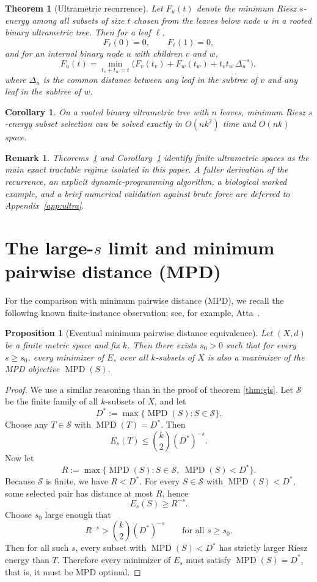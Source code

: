 \documentclass[11pt]{article}
\newtheorem{theorem}{Theorem}
\newtheorem{proposition}{Proposition}
\newtheorem{remark}{Remark}
\newtheorem{corollary}{Corollary}
\newcommand{\MM}[1]{\operatorname{MPD}\!\left(#1\right)}
\newcommand{\bin}[1]{\binom{#1}{2}}
\begin{document}
\begin{theorem}[Ultrametric recurrence]\label{thm:ultra}
Let $F_u(t)$ denote the minimum Riesz $s$-energy among all subsets of size $t$ chosen from the leaves below node $u$ in a rooted binary ultrametric tree. Then for a leaf $\ell$,
\[
F_\ell(0)=0,\qquad F_\ell(1)=0,
\]
and for an internal binary node $u$ with children $v$ and $w$,
\[
F_u(t)=\min_{t_v+t_w=t}\bigl(F_v(t_v)+F_w(t_w)+t_v t_w\,\Delta_u^{-s}\bigr),
\]
where $\Delta_u$ is the common distance between any leaf in the subtree of $v$ and any leaf in the subtree of $w$.
\end{theorem}

\begin{corollary}\label{cor:ultra-complexity}
On a rooted binary ultrametric tree with $n$ leaves, minimum Riesz $s$-energy subset selection can be solved exactly in $O(nk^2)$ time and $O(nk)$ space.
\end{corollary}

\begin{remark}
Theorems~\ref{thm:ultra} and Corollary~\ref{cor:ultra-complexity} identify finite ultrametric spaces as the main exact tractable regime isolated in this paper. A fuller derivation of the recurrence, an explicit dynamic-programming algorithm, a biological worked example, and a brief numerical validation against brute force are deferred to Appendix~\ref{app:ultra}.
\end{remark}

\section{The large-\texorpdfstring{$s$}{s} limit and minimum pairwise distance (MPD)}

For the comparison with minimum pairwise distance (MPD), we recall the following known finite-instance observation; see, for example, Atta~\cite{Atta2026}.

\begin{proposition}[Eventual minimum pairwise distance equivalence]\label{thm:limit}
Let $(X,d)$ be a finite metric space and fix $k$. Then there exists $s_0>0$ such that for every $s\ge s_0$, every minimizer of $E_s$ over all $k$-subsets of $X$ is also a maximizer of the MPD objective $\MM{S}$.
\end{proposition}

\begin{proof}
We use a similar reasoning than in the proof of theorem \ref{thm:gis}.
Let $\mathcal{S}$ be the finite family of all $k$-subsets of $X$, and let
\[
D^*:=\max\{\MM{S}:S\in\mathcal{S}\}.
\]
Choose any $T\in\mathcal{S}$ with $\MM{T}=D^*$. Then
\[
E_s(T)\le \bin{k}(D^*)^{-s}.
\]
Now let
\[
R:=\max\{\MM{S}:S\in\mathcal{S},\ \MM{S}<D^*\}.
\]
Because $\mathcal{S}$ is finite, we have $R<D^*$. For every $S\in\mathcal{S}$ with $\MM{S}<D^*$, some selected pair has distance at most $R$, hence
\[
E_s(S)\ge R^{-s}.
\]
Choose $s_0$ large enough that
\[
R^{-s}>\bin{k}(D^*)^{-s}
\qquad\text{for all }s\ge s_0.
\]
Then for all such $s$, every subset with $\MM{S}<D^*$ has strictly larger Riesz energy than $T$. Therefore every minimizer of $E_s$ must satisfy $\MM{S}=D^*$, that is, it must be MPD optimal.
\end{proof}
\end{document}
